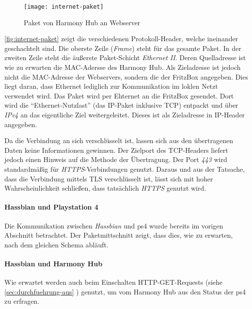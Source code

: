 \begin{figure}[h!]
    \centering
    \texttt{[image: internet-paket]}
    \caption{Paket von Harmony Hub an Webserver}\label{fig:internet-paket}
\end{figure}


\autoref{fig:internet-paket} zeigt die verschiedenen Protokoll-Header, welche ineinander geschachtelt sind.
Die oberste Zeile (\textit{Frame}) steht für das gesamte Paket.
In der zweiten Zeile steht die äußerste Paket-Schicht \textit{Ethernet II}.
Deren Quelladresse ist wie zu erwarten die MAC-Adersse des Harmony Hub.
Als Zieladresse ist jedoch nicht die MAC-Adresse der Webservers,
sondern die der FritzBox angegeben. Dies liegt daran, dass Ethernet lediglich zur Kommunikation im loklen Netzt verwendet wird.
Das Paket wird per Ehternet an die FritzBox gesendet.
Dort wird die \enquote{Ethernet-Nutzlast} (das IP-Paket inklusive TCP) entpackt und über \textit{IPv4} an das eigentliche Ziel weitergeleitet.
Dieses ist als Zieladresse in IP-Header angegeben.

Da die Verbindung an sich verschlüsselt ist, lassen sich aus den übertragenen Daten keine Informationen gewinnen.
Der Zielport des TCP-Headers liefert jedoch einen Hinweis auf die Methode der Übertragung.
Der Port \textit{443} wird standardmäßig für \textit{HTTPS}-Verbindungen genutzt.
Daraus und aus der Tatsache, dass die Verbindung mittels TLS verschlüsselt ist,
lässt sich mit hoher Wahrscheinlichkeit schließen, dass tatsächlich \textit{HTTPS} genutzt wird.


\paragraph{Hassbian und Playstation 4}
Die Kommunikation zwischen \textit{Hassbian} und \ac{ps4} wurde bereits im vorigen Abschnitt betrachtet.
Der Paketmittschnitt zeigt, dass dies, wie zu erwarten, nach dem gleichen Schema abläuft.

\paragraph{Hassbian und Harmony Hub}
Wie erwartet werden auch beim Einschalten HTTP-GET-Requests (siehe \ref{sec:durchfuehrung-aus} \textit{}) genutzt,
um vom Harmony Hub aus den Status der \ac{ps4} zu erfragen.

